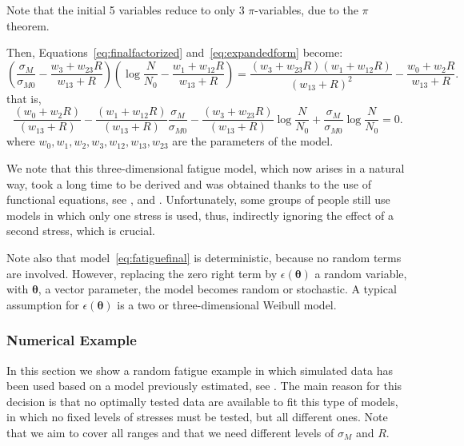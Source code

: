 \documentclass[
	11pt, %
	fleqn, %
	a4paper, %
]{LegrandOrangeBook}
\begin{document}
Note that the initial 5 variables reduce to only 3 $\pi$-variables, due to the $\pi$ theorem.

Then, Equations~\eqref{eq:finalfactorized} and~\eqref{eq:expandedform} become:
\begin{equation}
\left(\frac{\sigma_M}{\sigma_{M0}} - \frac{w_3 + w_{23}R}{w_{13} + R}\right)\left(\log\frac{N}{N_0} - \frac{w_1 + w_{12}R}{w_{13} + R}\right) = \frac{(w_3 + w_{23}R)(w_1 + w_{12}R)}{(w_{13} + R)^2} - \frac{w_0 + w_2R}{w_{13} + R}.
\label{eq:fatiguemodel}
\end{equation}
that is,
\begin{equation}
\frac{(w_0 + w_2R)}{(w_{13} + R)} - \frac{(w_1 + w_{12}R)}{(w_{13} + R)}\frac{\sigma_M}{\sigma_{M0}} - \frac{(w_3 + w_{23}R)}{(w_{13} + R)}\log\frac{N}{N_0} + \frac{\sigma_M}{\sigma_{M0}}\log\frac{N}{N_0} = 0.
\label{eq:fatiguefinal}
\end{equation}
where $w_0,w_1,w_2,w_3,w_{12},w_{13},w_{23}$ are the parameters of the model.

We note that this three-dimensional fatigue model, which now arises in a natural way, took a long time to be derived and was obtained thanks to the use of functional equations, see \cite{castillo2009unified}, \cite{castillo2009statistical} and \cite{koller2009experimental}. Unfortunately, some groups of people still use models in which only one stress is used, thus, indirectly ignoring the effect of a second stress, which is crucial.

Note also that model~\eqref{eq:fatiguefinal} is deterministic, because no random terms are involved. However, replacing the zero right term by $\epsilon(\boldsymbol{\theta})$ a random variable, with $\boldsymbol{\theta}$, a vector parameter, the model becomes random or stochastic. A typical assumption for $\epsilon(\boldsymbol{\theta})$ is a two or three-dimensional Weibull model.

\subsubsection{Numerical Example}
In this section we show a random fatigue example in which simulated data has been used based on a model previously estimated, see \cite{CASTILLO2022106596}. The main reason for this decision is that no optimally tested data are available to fit this type of models, in which no fixed levels of stresses must be tested, but all different ones. Note that we aim to cover all ranges and that we need different levels of $\sigma_M$ and $R$.
\end{document}
